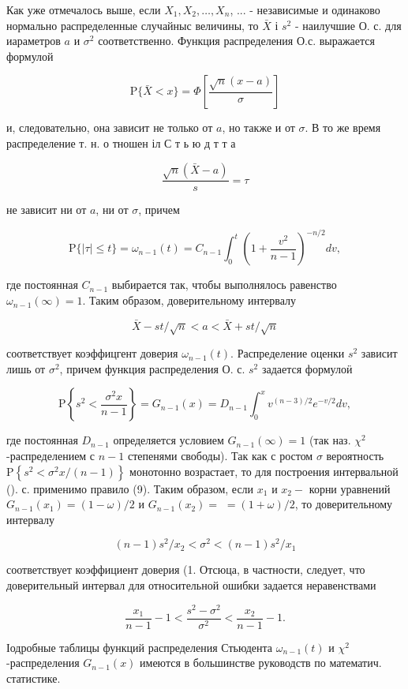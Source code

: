 \documentclass[10pt]{article}
\begin{document}
Как уже отмечалось выше, если $X_{1}, X_{2}, \ldots, X_{n}$, ... - независимые и одинаково нормально распределенные случайныс величины, то $\bar{X}$ і $s^{2}$ - наилучшие О. с. для иараметров $a$ и $\sigma^{2}$ соответственно. Функция распределения О.с. выражается формулой

\[
\mathrm{P}\{\bar{X}<x\}=\Phi\left[\frac{\sqrt{n}(x-a)}{\sigma}\right]
\]

и, следовательно, она зависит не только от $a$, но также и от $\sigma$. В то же время распределение т. н. о тношен іл С т ь ю д т т а

\[
\frac{\sqrt{n}(\bar{X}-a)}{s}=\tau
\]

не зависит ни от $a$, ни от $\sigma$, причем

\[
\mathrm{P}\{|\tau| \leqslant t\}=\omega_{n-1}(t)=C_{n-1} \int_{0}^{t}\left(1+\frac{v^{2}}{n-1}\right)^{-n / 2} d v,
\]

где постоянная $C_{n-1}$ выбирается так, чтобы выполнялось равенство $\omega_{n-1}(\infty)=1$. Таким образом, доверительному интервалу

\[
\bar{X}-s t / \sqrt{n}<a<\bar{X}+s t / \sqrt{n}
\]

соответствует коэффицгент доверия $\omega_{n-1}(t)$. Распределение оценки $s^{2}$ зависит лишь от $\sigma^{2}$, причем функция распределения О. с. $s^{2}$ задается формулоӥ

\[
\mathrm{P}\left\{s^{2}<\frac{\sigma^{2} x}{n-1}\right\}=G_{n-1}(x)=D_{n-1} \int_{0}^{x} v^{(n-3) / 2} e^{-v / 2} d v,
\]

где постоянная $D_{n-1}$ определяется условием $G_{n-1}(\infty)=1$ (так наз. $\chi^{2}$-распределением с $n-1$ степенями свободы). Так как с ростом $\sigma$ вероятность $\mathrm{P}\left\{s^{2}<\sigma^{2} x /(n-1)\right\}$ монотонно возрастает, то для построения интервальной (). с. применимо правило (9). Таким образом, если $x_{1}$ и $x_{2}-$ корни уравнений $G_{n-1}\left(x_{1}\right)=(1-\omega) / 2$ и $G_{n-1}\left(x_{2}\right)=$ $=(1+\omega) / 2$, то доверительному интервалу

\[
(n-1) s^{2} / x_{2}<\sigma^{2}<(n-1) s^{2} / x_{1}
\]

соответствует коэффициент доверия (1. Отсюца, в частности, следует, что доверительный интервал для относительной ошибки задается неравенствами

\[
\frac{x_{1}}{n-1}-1<\frac{s^{2}-\sigma^{2}}{\sigma^{2}}<\frac{x_{2}}{n-1}-1 .
\]

Іодробные таблицы функций распределения Стьюдента $\omega_{n-1}(t)$ и $\chi^{2}$-распределения $G_{n-1}(x)$ имеются в большинстве руководств по математич. статистике.
\end{document}
